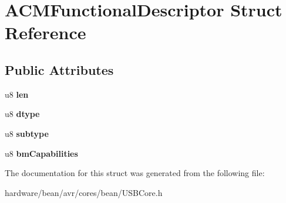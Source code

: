 \hypertarget{struct_a_c_m_functional_descriptor}{}\section{A\+C\+M\+Functional\+Descriptor Struct Reference}
\label{struct_a_c_m_functional_descriptor}
\subsection*{Public Attributes}
\begin{DoxyCompactItemize}
\item 
\hypertarget{struct_a_c_m_functional_descriptor_aaeda91f387fb2185f703edcbec992398}{}u8 {\bfseries len}\label{struct_a_c_m_functional_descriptor_aaeda91f387fb2185f703edcbec992398}

\item 
\hypertarget{struct_a_c_m_functional_descriptor_aefd5ee02fa9ef19cc96ee191e90a1c90}{}u8 {\bfseries dtype}\label{struct_a_c_m_functional_descriptor_aefd5ee02fa9ef19cc96ee191e90a1c90}

\item 
\hypertarget{struct_a_c_m_functional_descriptor_a9b7727390ce66baee8b7175dbab62a81}{}u8 {\bfseries subtype}\label{struct_a_c_m_functional_descriptor_a9b7727390ce66baee8b7175dbab62a81}

\item 
\hypertarget{struct_a_c_m_functional_descriptor_a218920f326b1c8f3faacd4a9592f30d8}{}u8 {\bfseries bm\+Capabilities}\label{struct_a_c_m_functional_descriptor_a218920f326b1c8f3faacd4a9592f30d8}

\end{DoxyCompactItemize}


The documentation for this struct was generated from the following file\+:\begin{DoxyCompactItemize}
\item 
hardware/bean/avr/cores/bean/U\+S\+B\+Core.\+h\end{DoxyCompactItemize}
